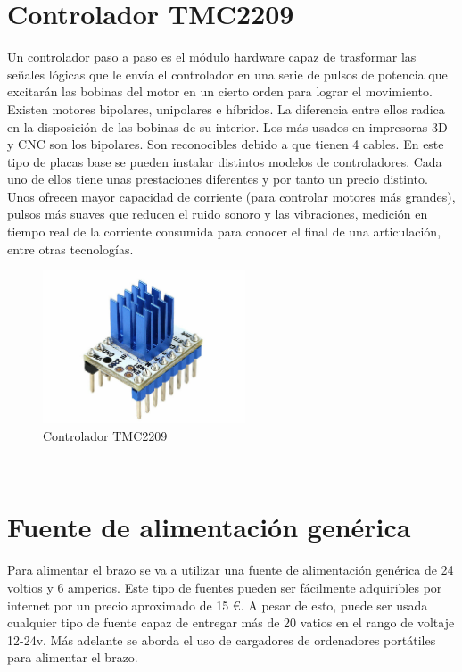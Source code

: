 \section{Controlador TMC2209}
\label{subsec:controladorPAP}
Un controlador paso a paso es el módulo hardware capaz de trasformar las señales lógicas que le envía el controlador en una serie de pulsos de
potencia que excitarán las bobinas del motor en un cierto orden para lograr el movimiento. 
Existen motores bipolares, unipolares e híbridos. La diferencia entre ellos radica en la disposición de las bobinas de su interior. Los más usados 
en impresoras 3D y CNC son los bipolares. Son reconocibles debido a que tienen 4 cables.
En este tipo de placas base se pueden instalar distintos modelos de controladores. Cada uno de ellos tiene unas prestaciones diferentes y por tanto 
un precio distinto. Unos ofrecen mayor capacidad de corriente (para controlar motores más grandes), pulsos más suaves que reducen el 
ruido sonoro y las vibraciones, medición en tiempo real de la corriente consumida para conocer el final de una articulación, entre otras tecnologías.  
\begin{figure} [h!]
    \begin{center}
      \includegraphics[width=6cm]{figs/TMC2209.jpg}
    \end{center}
    \caption{Controlador TMC2209}
    \label{fig:robSoldering}
  \end{figure}\ 

\newpage
\section{Fuente de alimentación genérica}
\label{subsec:fuente_alimentacion}
Para alimentar el brazo se va a utilizar una fuente de alimentación genérica de 24 voltios y 6 amperios. Este tipo de fuentes pueden ser 
fácilmente adquiribles por internet por un precio aproximado de 15 \euro. A pesar de esto, puede ser usada cualquier tipo de fuente capaz de 
entregar más de 20 vatios en el rango de voltaje 12-24v. Más adelante se aborda el uso de cargadores de ordenadores portátiles para alimentar el 
brazo.

